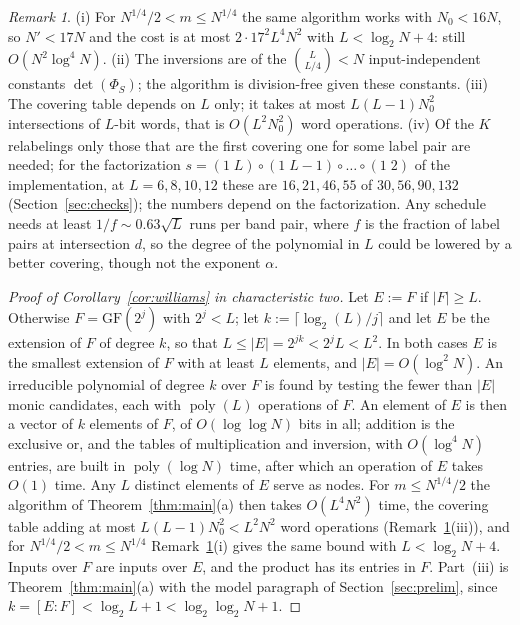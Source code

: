 \documentclass[11pt]{article}
\theoremstyle{definition}
\theoremstyle{remark}
\newtheorem{remark}[theorem]{Remark}
\newcommand{\GF}{\mathrm{GF}}
\newcommand{\Nz}{N_0}
\DeclareMathOperator{\poly}{poly}
\begin{document}
\begin{remark}\label{rem:constants}
(i) For $N^{1/4}/2<m\le N^{1/4}$ the same algorithm works with $\Nz<16N$, so $N'<17N$ and the cost is at most $2\cdot17^2L^4N^2$ with $L<\log_2N+4$: still $O(N^2\log^4N)$. (ii) The inversions are of the $\binom L{L/4}<N$ input-independent constants $\det(\Phi_S)$; the algorithm is division-free given these constants. (iii) The covering table depends on $L$ only; it takes at most $L(L-1)\Nz^2$ intersections of $L$-bit words, that is $O(L^2\Nz^2)$ word operations. (iv) Of the $K$ relabelings only those that are the first covering one for some label pair are needed; for the factorization $s=(1\;L)\circ(1\;L{-}1)\circ\dots\circ(1\;2)$ of the implementation, at $L=6,8,10,12$ these are $16,21,46,55$ of $30,56,90,132$ (Section~\ref{sec:checks}); the numbers depend on the factorization. Any schedule needs at least $1/f\sim0.63\sqrt L$ runs per band pair, where $f$ is the fraction of label pairs at intersection $d$, so the degree of the polynomial in $L$ could be lowered by a better covering, though not the exponent $\alpha$.
\end{remark}

\begin{proof}[Proof of Corollary~\ref{cor:williams} in characteristic two]
Let $E:=F$ if $|F|\ge L$. Otherwise $F=\GF(2^j)$ with $2^j<L$; let $k:=\lceil\log_2(L)/j\rceil$ and let $E$ be the extension of $F$ of degree $k$, so that $L\le|E|=2^{jk}<2^jL<L^2$. In both cases $E$ is the smallest extension of $F$ with at least $L$ elements, and $|E|=O(\log^2N)$. An irreducible polynomial of degree $k$ over $F$ is found by testing the fewer than $|E|$ monic candidates, each with $\poly(L)$ operations of $F$. An element of $E$ is then a vector of $k$ elements of $F$, of $O(\log\log N)$ bits in all; addition is the exclusive or, and the tables of multiplication and inversion, with $O(\log^4N)$ entries, are built in $\poly(\log N)$ time, after which an operation of $E$ takes $O(1)$ time. Any $L$ distinct elements of $E$ serve as nodes. For $m\le N^{1/4}/2$ the algorithm of Theorem~\ref{thm:main}(a) then takes $O(L^4N^2)$ time, the covering table adding at most $L(L-1)\Nz^2<L^2N^2$ word operations (Remark~\ref{rem:constants}(iii)), and for $N^{1/4}/2<m\le N^{1/4}$ Remark~\ref{rem:constants}(i) gives the same bound with $L<\log_2N+4$. Inputs over $F$ are inputs over $E$, and the product has its entries in $F$. Part~(iii) is Theorem~\ref{thm:main}(a) with the model paragraph of Section~\ref{sec:prelim}, since $k=[E:F]<\log_2L+1<\log_2\log_2N+1$.
\end{proof}
\end{document}
